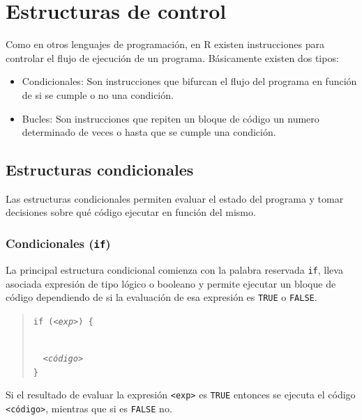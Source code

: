 \documentclass[
  a4paper,
]{scrreport}
\providecommand{\tightlist}{%
  \setlength{\itemsep}{0pt}\setlength{\parskip}{0pt}}\usepackage{longtable,booktabs,array}
\theoremstyle{definition}
\theoremstyle{definition}
\theoremstyle{remark}
\begin{document}

\hypertarget{estructuras-de-control}{%
\chapter{Estructuras de control}\label{estructuras-de-control}}

Como en otros lenguajes de programación, en R existen instrucciones para
controlar el flujo de ejecución de un programa. Básicamente existen dos
tipos:

\begin{itemize}
\tightlist
\item
  Condicionales: Son instrucciones que bifurcan el flujo del programa en
  función de si se cumple o no una condición.
\item
  Bucles: Son instrucciones que repiten un bloque de código un numero
  determinado de veces o hasta que se cumple una condición.
\end{itemize}

\hypertarget{estructuras-condicionales}{%
\section{Estructuras condicionales}\label{estructuras-condicionales}}

Las estructuras condicionales permiten evaluar el estado del programa y
tomar decisiones sobre qué código ejecutar en función del mismo.

\hypertarget{condicionales-if}{%
\subsection{\texorpdfstring{Condicionales
(\texttt{if})}{Condicionales (if)}}\label{condicionales-if}}

La principal estructura condicional comienza con la palabra reservada
\texttt{if}, lleva asociada expresión de tipo lógico o booleano y
permite ejecutar un bloque de código dependiendo de si la evaluación de
esa expresión es \texttt{TRUE} o \texttt{FALSE}.

\begin{quote}
\texttt{if\ (}\emph{\texttt{\textless{}exp\textgreater{}}}\texttt{)\ \{}\strut \\
  \emph{\texttt{\textless{}código\textgreater{}}}\\
\texttt{\}}
\end{quote}

Si el resultado de evaluar la expresión
\texttt{\textless{}exp\textgreater{}} es \texttt{TRUE} entonces se
ejecuta el código \texttt{\textless{}código\textgreater{}}, mientras que
si es \texttt{FALSE} no.
\end{document}
